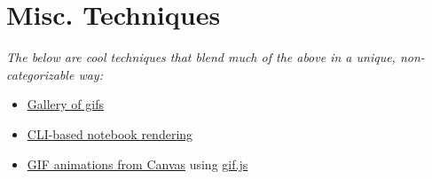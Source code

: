\section{Misc. Techniques}
\textit{The below are cool techniques that blend much of the above in a unique, non-categorizable way:}\\
\begin{itemize}
    \item \href{https://observablehq.com/@observablehq/introducing-visual-dataflow?collection=@observablehq/introduction}{Gallery of gifs}
    \item \href{https://observablehq.com/@asg017/introduction-to-the-new-observable-prerender-cli}{CLI-based notebook rendering}
    \item \href{https://observablehq.com/@mbostock/canvas-to-gif}{GIF animations from Canvas} using \href{https://jnordberg.github.io/gif.js/}{gif.js}
\end{itemize}